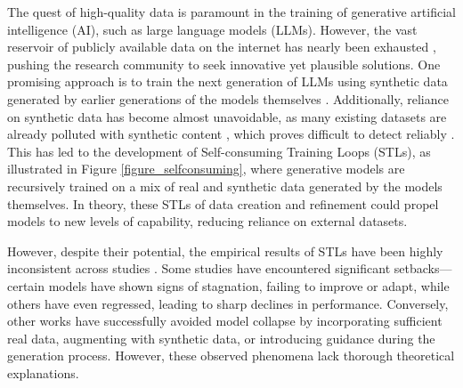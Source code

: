 The quest of high-quality data is paramount in the training of generative artificial intelligence (AI), such as large language models (LLMs). However, the vast reservoir of publicly available data on the internet has nearly been exhausted \citep{villalobos2022will}, pushing the research community to seek innovative yet plausible solutions. One promising approach is to train the next generation of LLMs using synthetic data generated by earlier generations of the models themselves \citep{briesch2023large}. Additionally, reliance on synthetic data has become almost unavoidable, as many existing datasets are already polluted with synthetic content \citep{schuhmann2022laion}, which proves difficult to detect reliably \citep{sadasivan2023can}. This has led to the development of Self-consuming Training Loops (STLs), as illustrated in Figure \ref{figure_selfconsuming}, where generative models are recursively trained on a mix of real and synthetic data generated by the models themselves. In theory, these STLs of data creation and refinement could propel models to new levels of capability, reducing reliance on external datasets. 

However, despite their potential, the empirical results of STLs have been highly inconsistent across studies \citep{shumailov2024ai,alemohammadself,xing2025caveats,dohmatob2024strong}. Some studies \citep{shumailov2024ai} have encountered significant setbacks—certain models have shown signs of stagnation, failing to improve or adapt, while others have even regressed, leading to sharp declines in performance. Conversely, other works \citep{gerstgrasser2024is,gillmanself,alemohammad2024self,ferbach2024self} have successfully avoided model collapse by incorporating sufficient real data, augmenting with synthetic data, or introducing guidance during the generation process. However, these observed phenomena lack thorough theoretical explanations. 


